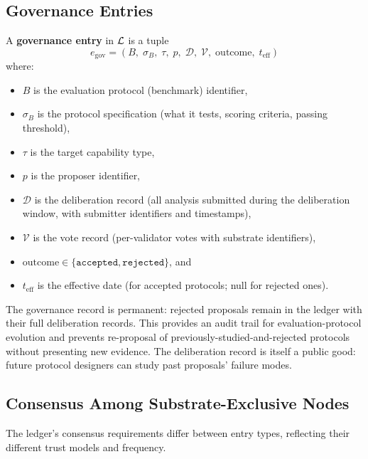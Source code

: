 \subsection{Governance Entries}
\label{sec:gov_entries}

\begin{definition}
\label{def:gov_entry}
A \textbf{governance entry} in $\mathcal{L}$ is a tuple
\[
    e_{\mathrm{gov}} = (B,\; \sigma_B,\; \tau,\; p,\;
    \mathcal{D},\; \mathcal{V},\; \mathrm{outcome},\; t_{\mathrm{eff}})
\]
where:
\begin{itemize}
    \item $B$ is the evaluation protocol (benchmark) identifier,
    \item $\sigma_B$ is the protocol specification (what it tests,
    scoring criteria, passing threshold),
    \item $\tau$ is the target capability type,
    \item $p$ is the proposer identifier,
    \item $\mathcal{D}$ is the deliberation record (all analysis
    submitted during the deliberation window, with submitter
    identifiers and timestamps),
    \item $\mathcal{V}$ is the vote record (per-validator votes with
    substrate identifiers),
    \item $\mathrm{outcome} \in \{\texttt{accepted},
    \texttt{rejected}\}$, and
    \item $t_{\mathrm{eff}}$ is the effective date (for accepted
    protocols; null for rejected ones).
\end{itemize}
\end{definition}

The governance record is permanent: rejected proposals remain in the
ledger with their full deliberation records.  This provides an audit
trail for evaluation-protocol evolution and prevents re-proposal of
previously-studied-and-rejected protocols without presenting new
evidence.  The deliberation record is itself a public good: future
protocol designers can study past proposals' failure modes.

\subsection{Consensus Among Substrate-Exclusive Nodes}
\label{sec:ledger_consensus}

The ledger's consensus requirements differ between entry types,
reflecting their different trust models and frequency.

